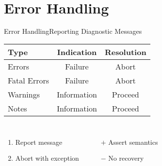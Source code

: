 \section{Error Handling}

\begin{frame}{Error Handling}{Reporting Diagnostic Messages}
\begin{center}
\begin{tabular}{@{}lcc@{}}
\toprule Type & Indication & Resolution \\ \midrule
Errors & Failure & Abort \\
Fatal Errors & Failure & Abort \\ \midrule
Warnings & Information & Proceed \\
Notes & Information & Proceed \\
\bottomrule
\end{tabular}
\end{center}
\begin{columns}[T]
\column{10em}
\begin{enumerate}
\item Report message
\item Abort with exception
\end{enumerate}
\column{8em}
\begin{itemize}
\item[$+$] Assert semantics
\item[$-$] No recovery
\end{itemize}
\end{columns}
\end{frame}

\concludepresentation
